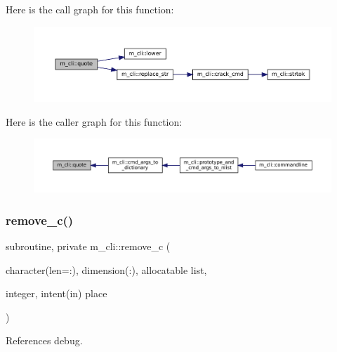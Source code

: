 Here is the call graph for this function\+:
\nopagebreak
\begin{figure}[H]
\begin{center}
\leavevmode
\includegraphics[width=350pt]{namespacem__cli_ac82fec2a5441020701fe3c64af3d9948_cgraph}
\end{center}
\end{figure}
Here is the caller graph for this function\+:
\nopagebreak
\begin{figure}[H]
\begin{center}
\leavevmode
\includegraphics[width=350pt]{namespacem__cli_ac82fec2a5441020701fe3c64af3d9948_icgraph}
\end{center}
\end{figure}
\mbox{\label{namespacem__cli_a05f549b10f50798d68003b8fd2a2d86a}} 
\subsubsection{\texorpdfstring{remove\+\_\+c()}{remove\_c()}}
{\footnotesize\ttfamily subroutine, private m\+\_\+cli\+::remove\+\_\+c (\begin{DoxyParamCaption}\item[{character(len=\+:), dimension(\+:), allocatable}]{list,  }\item[{integer, intent(in)}]{place }\end{DoxyParamCaption})\hspace{0.3cm}{\ttfamily [private]}}



References debug.

